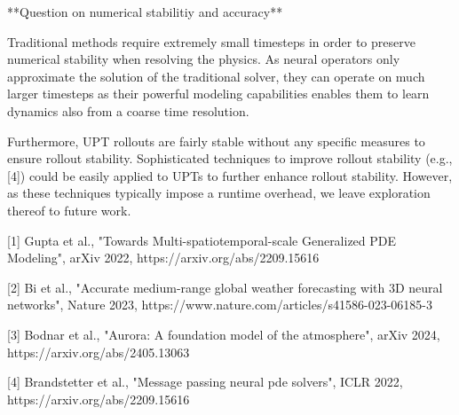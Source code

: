 **Question on numerical stabilitiy and accuracy**

Traditional methods require extremely small timesteps in order to preserve numerical stability when resolving the physics.
As neural operators only approximate the solution of the traditional solver, they can operate on much larger timesteps as their powerful modeling capabilities enables them to learn dynamics also from a coarse time resolution.


Furthermore, UPT rollouts are fairly stable without any specific measures to ensure rollout stability. Sophisticated techniques to improve rollout stability (e.g., [4]) could be easily applied to UPTs to further enhance rollout stability. However, as these techniques typically impose a runtime overhead, we leave exploration thereof to future work.


[1] Gupta et al., "Towards Multi-spatiotemporal-scale Generalized PDE Modeling", arXiv 2022, https://arxiv.org/abs/2209.15616

[2] Bi et al., "Accurate medium-range global weather forecasting with 3D neural networks", Nature 2023, https://www.nature.com/articles/s41586-023-06185-3

[3] Bodnar et al., "Aurora: A foundation model of the atmosphere", arXiv 2024, https://arxiv.org/abs/2405.13063


[4] Brandstetter et al., "Message passing neural pde solvers", ICLR 2022, https://arxiv.org/abs/2209.15616